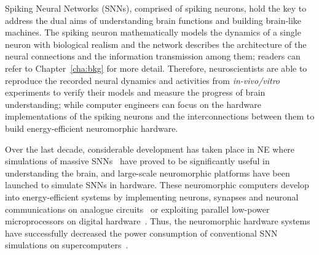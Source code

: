 Spiking Neural Networks (SNNs), comprised of spiking neurons, hold the key to address the dual aims of understanding brain functions and building brain-like machines.
The spiking neuron mathematically models the dynamics of a single neuron with biological realism and the network describes the architecture of the neural connections and the information transmission among them; readers can refer to Chapter~\ref{cha:bkg} for more detail.
Therefore, neuroscientists are able to reproduce the recorded neural dynamics and activities from \textit{in-vivo/vitro} experiments to verify their models and measure the progress of brain understanding;
while computer engineers can focus on the hardware implementations of the spiking neurons and the interconnections between them to build energy-efficient neuromorphic hardware.

Over the last decade, considerable development has taken place in NE where simulations of massive SNNs~\citep{markram2006blue,ananthanarayanan2009cat} have proved to be significantly useful in understanding the brain, and large-scale neuromorphic platforms have been launched to simulate SNNs in hardware.
These neuromorphic computers develop into energy-efficient systems by implementing neurons, synapses and neuronal communications on analogue circuits~\citep{schemmel2010wafer,benjamin2014neurogrid,yu201265k} or exploiting parallel low-power microprocessors on digital hardware~\citep{furber2014spinnaker,merolla2014million}. 
Thus, the neuromorphic hardware systems have successfully decreased the power consumption of conventional SNN simulations on supercomputers~\citep{de2010world,sharp2012power}.

